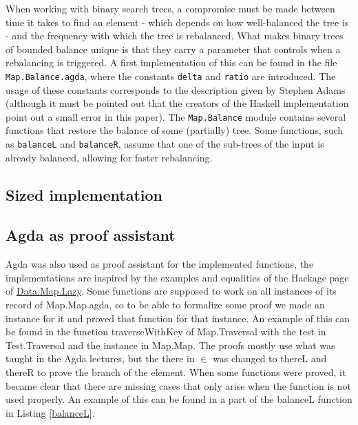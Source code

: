 \documentclass[a4paper,UKenglish,cleveref, autoref, thm-restate]{template/lipics-v2021}
\begin{document}
When working with binary search trees, a compromise must be made between time it takes to find an element - which depends on how well-balanced the tree is - and the frequency with which the tree is rebalanced. What makes binary trees of bounded balance unique is that they carry a parameter that controls when a rebalancing is triggered. A first implementation of this can be found in the file \texttt{Map.Balance.agda}, where the constants \texttt{delta} and \texttt{ratio} are introduced. The usage of these constants corresponds to the description given by Stephen Adams \cite{adams1993functional} (although it must be pointed out that the creators of the Haskell implementation point out a small error in this paper). The \texttt{Map.Balance} module contains several functions that restore the balance of some (partially) tree. Some functions, such as \texttt{balanceL} and \texttt{balanceR}, assume that one of the sub-trees of the input is already balanced, allowing for faster rebalancing.


\subsection*{Sized implementation}

\subsection*{Agda as proof assistant}
Agda was also used as proof assistant for the implemented functions, the implementations are inspired by the examples and equalities of the Hackage page of \href{https://hackage.haskell.org/package/containers-0.8/docs/Data-Map-Lazy.html}{Data.Map.Lazy}. 
Some functions are supposed to work on all instances of its record of Map.Map.agda, so to be able to formalize some proof we made an instance for it and proved that function for that instance. An example of this can be found in the function traverseWithKey of Map.Traversal with the test in Test.Traversal and the instance in Map.Map.
The proofs mostly use what was taught in the Agda lectures, but the there in $\in$ was changed to thereL and thereR to prove the branch of the element.
When some functions were proved, it became clear that there are missing cases that only arise when the function is not used properly. An example of this can be found in a part of the balanceL function in Listing \ref{balanceL}.
\end{document}
